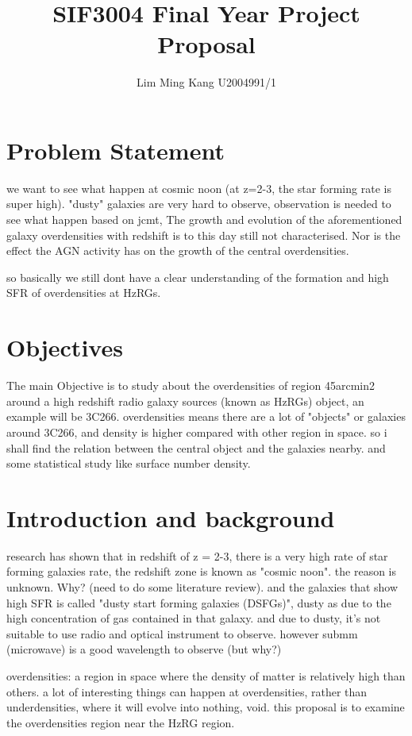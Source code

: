 \documentclass{article}
\title{SIF3004 Final Year Project Proposal}
\author{Lim Ming Kang U2004991/1}
\begin{document}
\maketitle
\section{Problem Statement}

we want to see what happen at cosmic noon (at z=2-3, the star forming rate is super high).
"dusty" galaxies are very hard to observe, observation is needed to see what happen
based on jcmt, The growth and evolution of the aforementioned galaxy overdensities with redshift is to this day still not characterised. Nor is the effect the AGN activity has on the growth of the central overdensities.

so basically we still dont have a clear understanding of the formation and high SFR of overdensities at HzRGs.

\section{Objectives}

The main Objective is to study about the overdensities of region 45arcmin2 around a high redshift radio galaxy sources (known as HzRGs) object, an example will be 3C266. overdensities means there are a lot of "objects" or galaxies around 3C266, and density is higher compared with other region in space. so i shall find the relation between the central object and the galaxies nearby. and some statistical study like surface number density.

\section{Introduction and background}

research has shown that in redshift of z = 2-3, there is a very high rate of star forming galaxies rate, the redshift zone is known as "cosmic noon". the reason is unknown. Why? (need to do some literature review). and the galaxies that show high SFR is called "dusty start forming galaxies (DSFGs)", dusty as due to the high concentration of gas contained in that galaxy. and due to dusty, it's not suitable to use radio and optical instrument to observe. however submm (microwave) is a good wavelength to observe (but why?) 

overdensities:
a region in space where the density of matter is relatively high than others. a lot of interesting things can happen at overdensities, rather than underdensities, where it will evolve into nothing, void. this proposal is to examine the overdensities region near the HzRG region.
\end{document}
